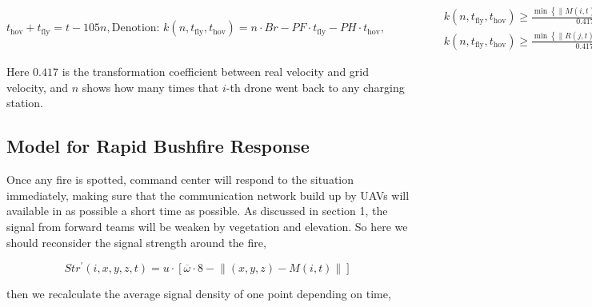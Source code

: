 \documentclass[13pt]{ctexart} %
\begin{document}
\begin{subequations}
    \begin{equation}
        t_{\text{hov}}+t_{\text{fly}}=t-105n,
    \end{equation}
    \begin{equation*}
            \text{Denotion:    }
            k(n, t_{\text{fly}}, t_{\text{hov}}) = n\cdot Br-PF\cdot t_{\text{fly}}-PH\cdot t_{\text{hov}},
    \end{equation*}
    \begin{equation}
    \begin{aligned}
        \qquad\qquad & k(n, t_{\text{fly}}, t_{\text{hov}})
        \geq\frac{\min\left\{\lVert
                M(i,t)-Chg(q)
            \rVert ,q
            \right\}}{
                0.417\cdot V_{\text{max}}
                },
        \ \forall t\forall i,\\
        & k(n, t_{\text{fly}}, t_{\text{hov}})
        \geq\frac{\min\left\{\lVert
                R(j,t)-Chg(q)
            \rVert ,q
            \right\}}{
                0.417\cdot V_{\text{max}}
                },
        \ \forall t\forall j,
    \end{aligned}
    \end{equation}
\end{subequations}

Here $0.417$ is the transformation coefficient between real velocity and grid velocity, and $n$ shows how many times that $i$-th drone went back to any charging station.


\subsection{Model for Rapid Bushfire Response}
Once any fire is spotted, command center will respond to the situation immediately, making sure that the communication network build up by UAVs will available in as possible a short time as possible. As discussed in section 1, the signal from forward teams will be weaken by vegetation and elevation. So here we should reconsider the signal strength around the fire,

\begin{equation}
    Str^{\prime}(i,x,y,z,t)
    =u\cdot\left[
            \overline{\omega}\cdot 8
            -\lVert
                (x,y,z)-M(i,t)
            \rVert
        \right]
\end{equation}

then we recalculate the average signal density of one point depending on time,
\end{document}
